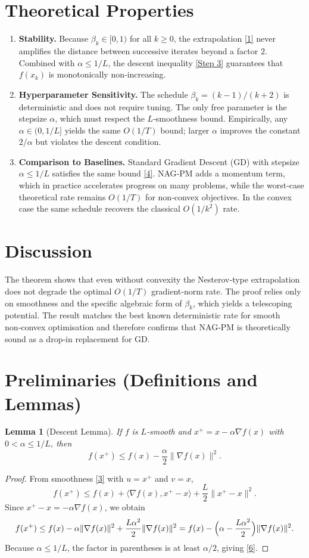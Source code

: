 \documentclass{article}
\newtheorem{lemma}{Lemma}
\begin{document}
\section*{Theoretical Properties}
\begin{enumerate}[label=\arabic*.]
\item \textbf{Stability.}  
Because $\beta_k\in[0,1)$ for all $k\ge0$, the extrapolation \eqref{1} never amplifies the distance between successive iterates beyond a factor $2$. Combined with $\alpha\le 1/L$, the descent inequality \eqref{Step 3} guarantees that $f(x_k)$ is monotonically non‑increasing.

\item \textbf{Hyperparameter Sensitivity.}  
The schedule $\beta_k=(k-1)/(k+2)$ is deterministic and does not require tuning. The only free parameter is the stepsize $\alpha$, which must respect the $L$‑smoothness bound. Empirically, any $\alpha\in(0,1/L]$ yields the same $O(1/T)$ bound; larger $\alpha$ improves the constant $2/\alpha$ but violates the descent condition.

\item \textbf{Comparison to Baselines.}  
Standard Gradient Descent (GD) with stepsize $\alpha\le 1/L$ satisfies the same bound \eqref{4}. NAG‑PM adds a momentum term, which in practice accelerates progress on many problems, while the worst‑case theoretical rate remains $O(1/T)$ for non‑convex objectives. In the convex case the same schedule recovers the classical $O(1/k^2)$ rate.
\end{enumerate}

\section*{Discussion}
The theorem shows that even without convexity the Nesterov‑type extrapolation does not degrade the optimal $O(1/T)$ gradient‑norm rate. The proof relies only on smoothness and the specific algebraic form of $\beta_k$, which yields a telescoping potential. The result matches the best known deterministic rate for smooth non‑convex optimisation and therefore confirms that NAG‑PM is theoretically sound as a drop‑in replacement for GD.

\newpage
\section*{Preliminaries (Definitions and Lemmas)}
\begin{lemma}[Descent Lemma]\label{lem:descent}
If $f$ is $L$‑smooth and $x^{+}=x-\alpha\nabla f(x)$ with $0<\alpha\le 1/L$, then
\[
f(x^{+})\le f(x)-\frac{\alpha}{2}\|\nabla f(x)\|^2 .
\tag{6}
\]
\end{lemma}
\begin{proof}
From smoothness \eqref{3} with $u=x^{+}$ and $v=x$,
\[
f(x^{+})\le f(x)+\langle\nabla f(x),x^{+}-x\rangle+\frac{L}{2}\|x^{+}-x\|^2 .
\]
Since $x^{+}-x=-\alpha\nabla f(x)$, we obtain
\[
f(x^{+})\le f(x)-\alpha\|\nabla f(x)\|^2+\frac{L\alpha^{2}}{2}\|\nabla f(x)\|^2
= f(x)-\Bigl(\alpha-\frac{L\alpha^{2}}{2}\Bigr)\|\nabla f(x)\|^2 .
\]
Because $\alpha\le 1/L$, the factor in parentheses is at least $\alpha/2$, giving \eqref{6}.
\end{proof}
\end{document}
